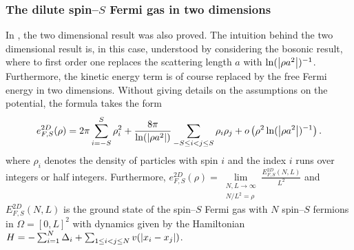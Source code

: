 \subsubsection{The dilute spin--$ S $ Fermi gas in two dimensions}
In \cite{lieb2005ground}, the two dimensional result was also proved. The intuition behind the two dimensional result is, in this case, understood by considering the bosonic result, where to first order one replaces the scattering length $ a $ with $ \ln(\left\lvert \rho a^2 \right\rvert)^{-1} $. Furthermore, the kinetic energy term is of course replaced by the free Fermi energy in two dimensions. Without giving details on the assumptions on the potential, the formula takes the form
\begin{equation}
e^{2D}_{F,S}(\rho)=2\pi \sum_{i=-S}^{S}\rho_i^{2}+\frac{8\pi}{\ln(\left\lvert \rho a^2 \right\rvert)} \sum_{-S\leq i<j\leq S}\rho_i\rho_j+ o\left(\rho^2\ln(\left\lvert \rho a^2 \right\rvert)^{-1}\right).
\end{equation}
where $ \rho_i $ denotes the density of particles with spin $ i $ and the index $ i $ runs over integers or half integers. Furthermore, $ e^{2D}_{F,S}(\rho)=\lim\limits_{\substack{N,L\to\infty\\ N/L^2=\rho}}\frac{E^{2D}_{F,S}(N,L)}{L^2} $ and $ E^{2D}_{F,S}(N,L) $ is the ground state of the spin--$ S $ Fermi gas with $ N $ spin--$ S $ fermions in $ \Omega=[0,L]^2 $ with dynamics given by the Hamiltonian $ H=-\sum_{i=1}^{N}\Delta_i+\sum_{1\leq i<j\leq N} v(\left\lvert x_i-x_j \right\rvert) $.\\


